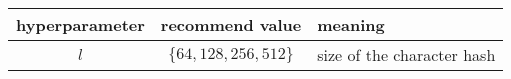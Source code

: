 \begin{tabular}{ccl}
\hline
hyperparameter & recommend value & meaning \\
\hline
\hline
$l$ & $\{64,128,256,512\}$ & size of the character hash \\

\hline
\end{tabular}
